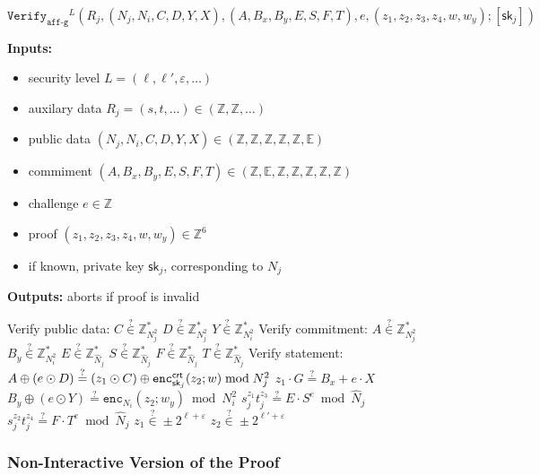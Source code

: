 \documentclass[11pt]{article}
\def\crt{{\sf crt}}
\newenvironment{inlineAlgorithm}{}{}
\newcommand{\algoName}[1]{#1 \par}
\newcommand{\algoInputsList}[1]{
    {\small \bf Inputs:} 
        \begin{itemize}[noitemsep,topsep=0pt]
            #1
        \end{itemize}
}
\newcommand{\algoOutputs}[1]{
    {\small \bf Outputs:} #1 \par
}
\newcommand{\enc}{\ensuremath{\mathtt{enc}}}
\newcommand{\verify}[1]{\ensuremath{\mathtt{Verify}_{\mathtt{#1}}}}
\newcommand{\sk}{\textsf{sk}}
\newcommand{\E}{\mathbb{E}}
\newcommand{\Z}{\mathbb{Z}}
\newcommand{\?}[1]{\stackrel{?}{#1}}
\begin{document}
\begin{description}
\item
\begin{inlineAlgorithm}
\algoName{$\verify{aff\mbox{-}g}^L(
    R_j,
    (N_j, N_i, C, D, Y, X),
    (A, B_x, B_y, E, S, F, T),
    e,
    (z_1, z_2, z_3, z_4, w, w_y);
    [\sk_j]
)$}
\algoInputsList{
    \item security level $L = (\ell, \ell', \varepsilon, \dots)$
    \item auxilary data $R_j = (s, t, \dots) \in (\Z, \Z, \dots)$
    \item public data $(N_j, N_i, C, D, Y, X) \in (\Z, \Z, \Z, \Z, \Z, \E)$
    \item commiment $(A, B_x, B_y, E, S, F, T) \in (\Z, \E, \Z, \Z, \Z, \Z, \Z)$
    \item challenge $e \in \Z$
    \item proof $(z_1, z_2, z_3, z_4, w, w_y) \in \Z^6$
    \item if known, private key $\sk_j$, corresponding to $N_j$
}
\algoOutputs{aborts if proof is invalid}
\begin{algorithmic}[1]
\Statex Verify public data:
\State $C \? \in \Z^*_{N_j^2}$
\State $D \? \in \Z^*_{N_j^2}$
\State $Y \? \in \Z^*_{N_i^2}$
\Statex Verify commitment:
\State $A \? \in \Z^*_{N_j^2}$
\State $B_y \? \in \Z^*_{N_i^2}$
\State $E \? \in \Z^*_{\hat N_j}$
\State $S \? \in \Z^*_{\hat N_j}$
\State $F \? \in \Z^*_{\hat N_j}$
\State $T \? \in \Z^*_{\hat N_j}$
\Statex Verify statement:
\State $A \oplus (e \odot D) \? = (z_1 \odot C) \oplus \enc^\crt_{\sk_j}(z_2; w)\bmod N_j^2$
\State $z_1 \cdot G \? = B_x + e \cdot X$
\State $B_y \oplus (e \odot Y) \? = \enc_{N_i}(z_2; w_y) \bmod N_i^2$
\State $s_j^{z_1} t_j^{z_3} \? = E \cdot S^e \bmod \hat N_j$
\State $s_j^{z_2} t_j^{z_4} \? = F \cdot T^e \bmod \hat N_j$
\State $z_1 \? \in \pm 2^{\ell + \varepsilon}$
\State $z_2 \? \in \pm 2^{\ell' + \varepsilon}$
\end{algorithmic}
\end{inlineAlgorithm}

\end{description}

\subsubsection{Non-Interactive Version of the Proof}
\end{document}
